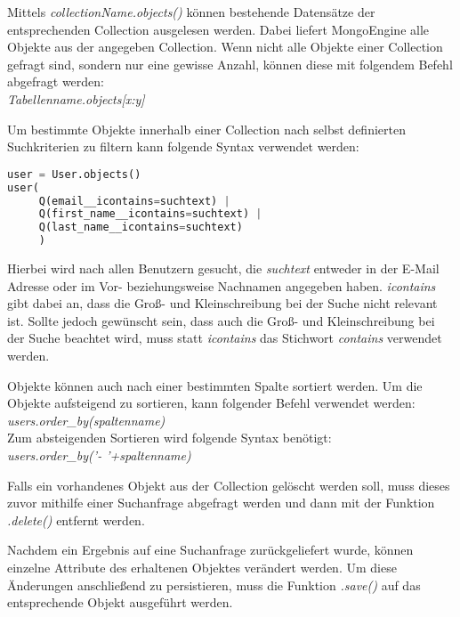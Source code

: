 Mittels \textit{collectionName.objects()} können bestehende Datensätze der entsprechenden Collection ausgelesen werden. Dabei liefert MongoEngine alle Objekte aus der angegeben Collection. Wenn nicht alle Objekte einer Collection gefragt sind, sondern nur eine gewisse Anzahl, können diese mit folgendem Befehl abgefragt werden:\\
\textit{Tabellenname.objects[x:y]}

Um bestimmte Objekte innerhalb einer Collection nach selbst definierten Suchkriterien zu filtern kann folgende Syntax verwendet werden:

\begin{lstlisting}[caption=Syntax für eine Suchanfrage an die Datenbank in Django, language=Python]
user = User.objects()
user(
     Q(email__icontains=suchtext) | 	 
     Q(first_name__icontains=suchtext) | 
     Q(last_name__icontains=suchtext)
     )
\end{lstlisting}

Hierbei wird nach allen Benutzern gesucht, die \textit{suchtext} entweder in der E-Mail Adresse oder im Vor- beziehungsweise Nachnamen angegeben haben. \textit{icontains} gibt dabei an, dass die Groß- und Kleinschreibung bei der Suche nicht relevant ist. Sollte jedoch gewünscht sein, dass auch die Groß- und Kleinschreibung bei der Suche beachtet wird, muss statt \textit{icontains} das Stichwort \textit{contains} verwendet werden.

Objekte können auch nach einer bestimmten Spalte sortiert werden. Um die Objekte aufsteigend zu sortieren, kann folgender Befehl verwendet werden:\\
\textit{users.order\_by(spaltenname)}\\
Zum absteigenden Sortieren wird folgende Syntax benötigt:\\
\textit{users.order\_by('- '+spaltenname)}

Falls ein vorhandenes Objekt aus der Collection gelöscht werden soll, muss dieses zuvor mithilfe einer Suchanfrage abgefragt werden und dann mit der Funktion \textit{.delete()} entfernt werden. 

Nachdem ein Ergebnis auf eine Suchanfrage zurückgeliefert wurde, können einzelne Attribute des erhaltenen Objektes verändert werden. Um diese Änderungen anschließend zu persistieren, muss die Funktion \textit{.save()} auf das entsprechende Objekt ausgeführt werden.

